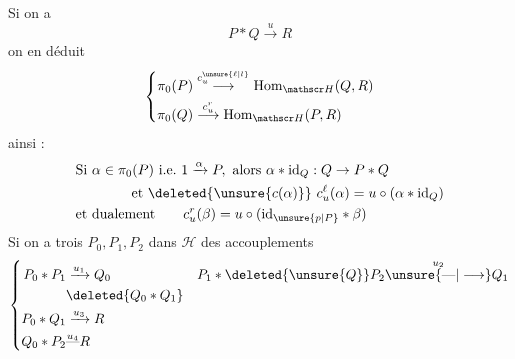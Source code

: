 Si on a
\[
P*Q\xrightarrow{u}R
\]
on en déduit
\[
\left\{\begin{aligned}
\pi_0(P)&\overset{c_u^{\unsure{\ell|l}}}{\longrightarrow}\mathrm{Hom}_{\mathscr H}(Q,R)\\
\pi_0(Q)&\overset{c_u^r}{\longrightarrow}\mathrm{Hom}_{\mathscr H}(P,R)
\end{aligned}\right.
\]
ainsi :
\margin{\unsure{!|]}}
\[
\begin{aligned}
&\text{Si }\alpha\in\pi_0(P)\ \text{i.e.}\ 1\xrightarrow{\alpha}P,\ \text{alors }\alpha*\mathrm{id}_Q:Q\to P*Q\\
&\hspace{4em}\text{et }\deleted{\unsure{c(\alpha)}}\ c_u^\ell(\alpha)=u\circ(\alpha*\mathrm{id}_Q)\\
&\text{et dualement}\qquad c_u^r(\beta)=u\circ(\mathrm{id}_{\unsure{p|P}}*\beta)
\end{aligned}
\]
 Si on a trois   $P_0,P_1,P_2$ dans $\mathscr H$ des accouplements
\[
\left\{\begin{aligned}
P_0*P_1&\xrightarrow{u_1}Q_0 & P_1*\deleted{\unsure{Q}}P_2&\overset{u_2}{\unsure{\text{---}|\longrightarrow}}Q_1\\
&\deleted{Q_0*Q_1}\\
P_0*Q_1&\xrightarrow{u_3}R\\
Q_0*P_2&\overset{u_4}{\text{---}}R
\end{aligned}\right.
\]

